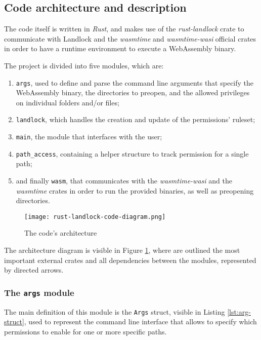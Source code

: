 \subsection{Code architecture and description}\label{sec:landlock-code-architecture}

The code itself is written in \textit{Rust}, and makes use of the
\textit{rust-landlock} \cite{rust-landlock} crate
to communicate with Landlock and the \textit{wasmtime} and \textit{wasmtime-wasi} official
crates in order to have a runtime environment to execute a WebAssembly binary.

The project is divided into five modules, which are:
\begin{enumerate}
  \item \texttt{args}, used to define and parse the command line arguments that specify the WebAssembly binary,
        the directories to preopen, and the allowed privileges on individual folders and/or files;
  \item \texttt{landlock}, which handles the creation and update of the permissions' ruleset;
  \item \texttt{main}, the module that interfaces with the user;
  \item \texttt{path\_access}, containing a helper structure to track permission for a single path;
  \item and finally \texttt{wasm}, that communicates with the \textit{wasmtime-wasi} and the \textit{wasmtime} crates
        in order to run the provided binaries, as well as preopening directories.
\end{enumerate}

\begin{figure}[ht]
  \centering
  \texttt{[image: rust-landlock-code-diagram.png]}
  \caption{The code's architecture}
  \label{fig:rust-landlock-code-architecture}
\end{figure}

The architecture diagram is visible in Figure \ref{fig:rust-landlock-code-architecture}, where
are outlined the most important external crates and all dependencies between the modules, represented
by directed arrows.

\subsubsection{The \texttt{args} module}
\label{sec:landlock-args-module}

The main definition of this module is the \texttt{Args} struct, visible in Listing \ref{lst:arg-struct},
used to represent the command line interface that allows to specify which permissions to enable
for one or more specific paths.

